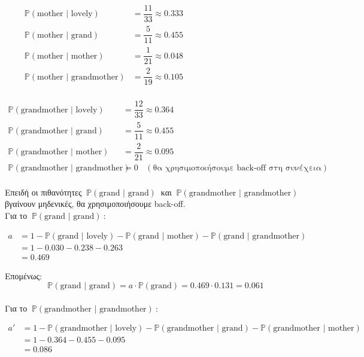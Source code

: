\documentclass[12pt,a4paper]{article}
\begin{document}
			\begin{align*}
				\mathbb{P}(\text{mother | lovely}) &= \dfrac{11}{33} \approx 0.333 \\
				\mathbb{P}(\text{mother | grand}) &= \dfrac{5}{11} \approx 0.455 \\
				\mathbb{P}(\text{mother | mother}) &= \dfrac{1}{21} \approx 0.048 \\
				\mathbb{P}(\text{mother | grandmother}) &= \dfrac{2}{19} \approx 0.105 ~~~~~~~~~~~~~~~~~~~~~~~~~~~~~~~~~~~~~~~~~~~~~~~~~~~~~~~~ \\
			\end{align*}
			
			\begin{align*}
				\mathbb{P}(\text{grandmother | lovely}) &= \dfrac{12}{33} \approx 0.364 \\
				\mathbb{P}(\text{grandmother | grand}) &= \dfrac{5}{11} \approx 0.455 \\
				\mathbb{P}(\text{grandmother | mother}) &= \dfrac{2}{21} \approx 0.095 \\
				\mathbb{P}(\text{grandmother | grandmother}) &= 0 ~~~~(\text{θα χρησιμοποιήσουμε back-off στη συνέχεια}) \\
			\end{align*}
			
			Επειδή οι πιθανότητες $~\mathbb{P}(\text{grand | grand})~$ και $~\mathbb{P}(\text{grandmother | grandmother})~$ βγαίνουν μηδενικές, θα χρησιμοποιήσουμε back-off. \\
			
			Για το $~\mathbb{P}(\text{grand | grand})~$:
			
			\begin{align*}
				a &= 1 - \mathbb{P}(\text{grand | lovely}) - \mathbb{P}(\text{grand | mother}) - \mathbb{P}(\text{grand | grandmother}) \\
				&= 1 - 0.030 - 0.238 - 0.263 \\
				&= 0.469
			\end{align*}
			
			Επομένως:
			\[
				\mathbb{P}(\text{grand | grand}) = a \cdot \mathbb{P}(\text{grand}) = 0.469 \cdot 0.131 = 0.061 
			\] \\
			
			Για το $~\mathbb{P}(\text{grandmother | grandmother})~$:
			
			\begin{align*}
				a' &= 1 - \mathbb{P}(\text{grandmother | lovely}) - \mathbb{P}(\text{grandmother | grand}) - \mathbb{P}(\text{grandmother | mother}) \\
				&= 1 - 0.364 - 0.455 - 0.095 \\ 
				&= 0.086
			\end{align*} \\
			
\end{document}
